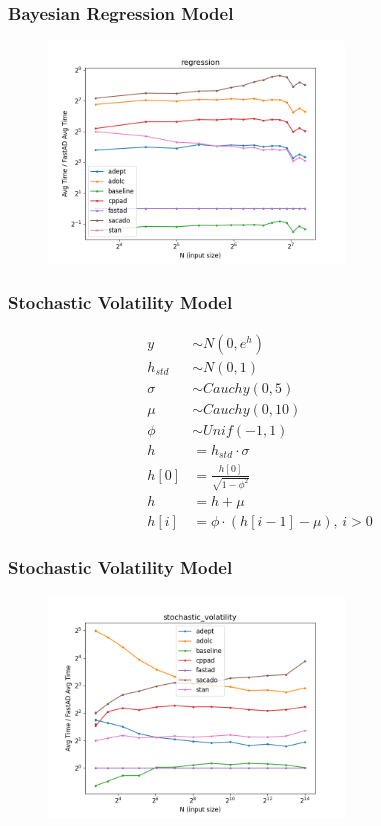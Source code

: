 \begin{frame}
\frametitle{Bayesian Regression Model}
\begin{figure}
    \includegraphics[width=0.7\textwidth]{../../figs/regression_fig.png}
\end{figure}
\end{frame}

\begin{frame}
\frametitle{Stochastic Volatility Model~\cite{stan-rm:2018}}
{\small
\begin{align*}
    y &\sim N(0, e^{h}) \\
    h_{std} &\sim N(0, 1) \\
    \sigma &\sim Cauchy(0,5) \\
    \mu &\sim Cauchy(0,10) \\
    \phi &\sim Unif(-1, 1) \\
    h &= h_{std} \cdot \sigma \\
    h[0] &= \frac{h[0]}{\sqrt{1 - \phi^2}} \\
    h &= h + \mu \\
    h[i] &= \phi \cdot (h[i-1] - \mu),\, i > 0
\end{align*}
}%
\end{frame}

\begin{frame}
\frametitle{Stochastic Volatility Model}
\begin{figure}
    \includegraphics[width=0.7\textwidth]{../../figs/stochastic_volatility_fig.png}
\end{figure}
\end{frame}

